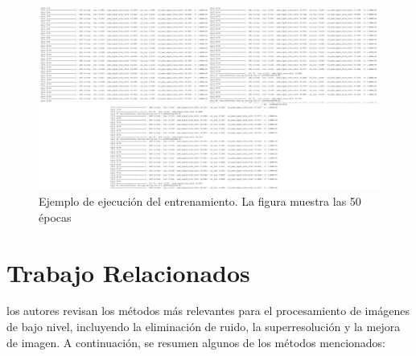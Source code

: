 \documentclass[a4paper,
               ]{jacow}
\begin{document}
\begin{figure}[!h]
    \centering
    \includegraphics*[width=.9\textwidth]{entrenamiento}
    \caption{Ejemplo de ejecución del entrenamiento. La figura muestra las 50 épocas }
    \label{fig:ejem_Entrenamiento}
\end{figure}

\section{Trabajo Relacionados}
 los autores revisan los métodos más relevantes para el procesamiento de imágenes de bajo nivel, incluyendo la eliminación de ruido, la superresolución y la mejora de imagen. A continuación, se resumen algunos de los métodos mencionados:
\end{document}
